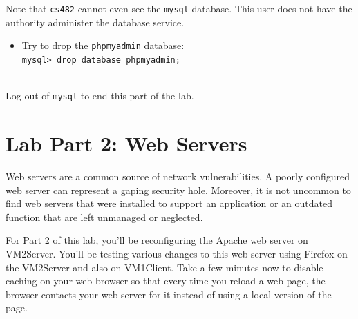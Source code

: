 \documentclass{article}
\begin{document}
Note that {\tt cs482} cannot even see the {\tt mysql} database. This user does not have the authority administer the database service.

\begin{itemize}
\item Try to drop the {\tt phpmyadmin} database: \\
{\tt mysql> drop database phpmyadmin;}
\end{itemize}

 \\
\noindent
Log out of {\tt mysql} to end this part of the lab.  

\section{Lab Part 2: Web Servers}

Web servers are a common source of network vulnerabilities. A poorly configured web server can represent a gaping security hole. Moreover, it is not uncommon to find web servers that were installed to support an application or an outdated function that are left unmanaged or neglected.

For Part 2 of this lab, you'll be reconfiguring the Apache web server on VM2Server.  You'll be testing various changes to this web server using Firefox on the VM2Server  and also on VM1Client.  Take a few minutes now to disable caching on your web browser so that every time you reload a web page, the browser contacts your web server for it instead of using a local version of the page.  
\end{document}
